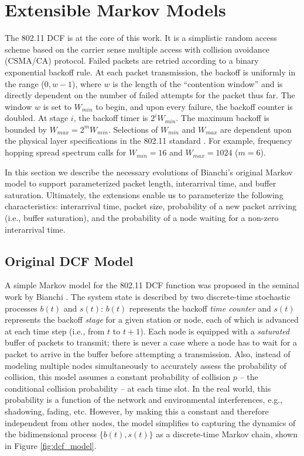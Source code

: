 \documentclass[conference]{IEEEtran}
\begin{document}
\section{Extensible Markov Models} \label{sec:models}
The 802.11 DCF \cite{ieee1997wireless} is at the core of this work. It is a simplistic random access scheme based on the carrier sense multiple access with collision avoidance (CSMA/CA) protocol. Failed packets are retried according to a binary exponential backoff rule. At each packet transmission, the backoff is uniformly in the range ($0, w-1$), where $w$ is the length of the ``contention window'' and is directly dependent on the number of failed attempts for the packet thus far. The window $w$ is set to $W_{min}$ to begin, and upon every failure, the backoff counter is doubled. At stage $i$, the backoff timer is $2^iW_{min}$. The maximum backoff is bounded by $W_{max} = 2^mW_{min}$. Selections of $W_{min}$ and $W_{max}$ are dependent upon the physical layer specifications in the 802.11 standard \cite{ieee1997wireless,dcf}. For example, frequency hopping spread spectrum calls for $W_{min} = 16$ and $W_{max} = 1024$ ($m = 6$). 

In this section we describe the necessary evolutions of Bianchi's original Markov model to support parameterized packet length, interarrival time, and buffer saturation. Ultimately, the extensions enable us to parameterize the following characteristics: interarrival time, packet size, probability of a new packet arriving (i.e., buffer saturation), and the probability of a node waiting for a non-zero interarrival time. 

\subsection{Original DCF Model}
A simple Markov model for the 802.11 DCF function was proposed in the seminal work by Bianchi \cite{dcf}. The system state is described by two discrete-time stochastic processes $b(t)$ and $s(t)$: $b(t)$ represents the backoff \emph{time counter} and $s(t)$ represents the backoff \emph{stage} for a given station or node, each of which is advanced at each time step (i.e., from $t$ to $t + 1$). Each node is equipped with a \emph{saturated} buffer of packets to transmit; there is never a case where a node has to wait for a packet to arrive in the buffer before attempting a transmission. Also, instead of modeling multiple nodes simultaneously to accurately assess the probability of collision, this model assumes a constant probability of collision $p$ -- the conditional collision probability -- at each time slot. In the real world, this probability is a function of the network and environmental interferences, e.g., shadowing, fading, etc. However, by making this a constant and therefore independent from other nodes, the model simplifies to capturing the dynamics of the bidimensional process $\{ b(t), s(t) \}$ as a discrete-time Markov chain, shown in Figure \ref{fig:dcf_model}. 
\end{document}
